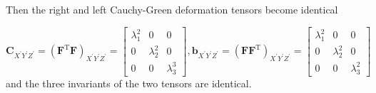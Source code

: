 Then the right and left Cauchy-Green deformation tensors become identical

\begin{equation}
 \mathbf{C}_{X^{\prime} Y^{\prime} Z^{\prime}}=\left(\mathbf{F}^{\mathrm{T}} \mathbf{F}\right)_{X^{\prime} Y^{\prime} Z^{\prime}}=\left[\begin{array}{ccc}\lambda_{1}^{2} & 0 & 0 \\ 0 & \lambda_{2}^{2} & 0 \\ 0 & 0 & \lambda_{3}^{3}\end{array}\right], \mathbf{b}_{X^{\prime} Y^{\prime} Z^{\prime}}=\left(\mathbf{F} \mathbf{F}^{\mathrm{T}}\right)_{X^{\prime} Y^{\prime} Z^{\prime}}=\left[\begin{array}{ccc}\lambda_{1}^{2} & 0 & 0 \\ 0 & \lambda_{2}^{2} & 0 \\ 0 & 0 & \lambda_{3}^{2}\end{array}\right] 
\end{equation}
and the three invariants of the two tensors are identical.

